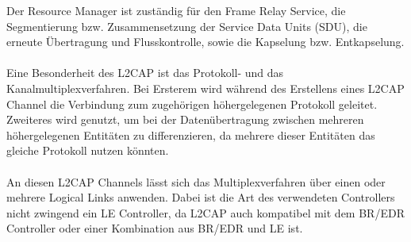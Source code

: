 Der Resource Manager ist zuständig für den Frame Relay Service, die Segmentierung bzw. Zusammensetzung der Service Data Units (SDU), die erneute Übertragung und Flusskontrolle, sowie die Kapselung bzw. Entkapselung.
\\\\
Eine Besonderheit des L2CAP ist das Protokoll- und das Kanalmultiplexverfahren. Bei Ersterem wird während des Erstellens eines L2CAP Channel die Verbindung zum zugehörigen höhergelegenen Protokoll geleitet. Zweiteres wird genutzt, um bei der Datenübertragung zwischen mehreren höhergelegenen Entitäten zu differenzieren, da mehrere dieser Entitäten das gleiche Protokoll nutzen könnten.
\\\\
An diesen L2CAP Channels lässt sich das Multiplexverfahren über einen oder mehrere Logical Links anwenden. Dabei ist die Art des verwendeten Controllers nicht zwingend ein LE Controller, da L2CAP auch kompatibel mit dem BR/EDR Controller oder einer Kombination aus BR/EDR und LE ist.
